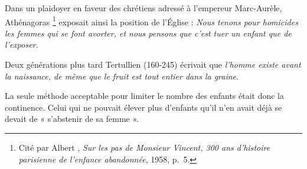  Dans un plaidoyer en faveur des chrétiens adressé à l'empereur Marc-Aurèle, Athénagoras%
\footnote{Cité par Albert , \emph{Sur les pas de Monsieur Vincent, 300 ans d'histoire parisienne de l'enfance abandonnée}, 1958, p.~5.}
exposait ainsi la position de l'Église : \emph{Nous tenons pour homicides les femmes qui se font avorter, et nous pensons que c'est tuer un enfant que de l'exposer.} 

 Deux générations plus tard Tertullien (160-245) écrivait que \emph{l'homme existe avant la naissance, de même que le fruit est tout entier dans la graine}. 

 La seule méthode acceptable pour limiter le nombre des enfants était donc la continence. Celui qui ne pouvait élever plus d'enfants qu'il n'en avait déjà se devait de « s'abstenir de sa femme ».
 


 

